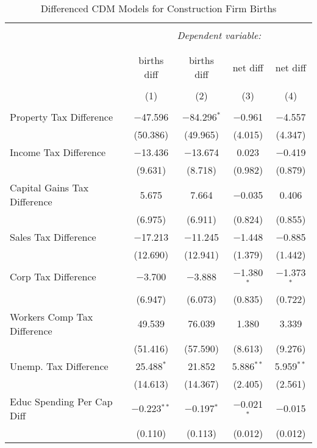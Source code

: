 
\begin{table}[!htbp] \centering 
  \caption{Differenced CDM Models for  Construction Firm Births} 
  \label{} 
\begin{tabular}{@{\extracolsep{5pt}}lcccc} 
\\[-1.8ex]\hline 
\hline \\[-1.8ex] 
 & \multicolumn{4}{c}{\textit{Dependent variable:}} \\ 
\cline{2-5} 
\\[-1.8ex] & \multicolumn{4}{c}{ } \\ 
 & births diff & births diff & net diff & net diff \\ 
\\[-1.8ex] & (1) & (2) & (3) & (4)\\ 
\hline \\[-1.8ex] 
 Property Tax Difference & $-$47.596 & $-$84.296$^{*}$ & $-$0.961 & $-$4.557 \\ 
  & (50.386) & (49.965) & (4.015) & (4.347) \\ 
  Income Tax Difference & $-$13.436 & $-$13.674 & 0.023 & $-$0.419 \\ 
  & (9.631) & (8.718) & (0.982) & (0.879) \\ 
  Capital Gains Tax Difference & 5.675 & 7.664 & $-$0.035 & 0.406 \\ 
  & (6.975) & (6.911) & (0.824) & (0.855) \\ 
  Sales Tax Difference & $-$17.213 & $-$11.245 & $-$1.448 & $-$0.885 \\ 
  & (12.690) & (12.941) & (1.379) & (1.442) \\ 
  Corp Tax Difference & $-$3.700 & $-$3.888 & $-$1.380$^{*}$ & $-$1.373$^{*}$ \\ 
  & (6.947) & (6.073) & (0.835) & (0.722) \\ 
  Workers Comp Tax Difference & 49.539 & 76.039 & 1.380 & 3.339 \\ 
  & (51.416) & (57.590) & (8.613) & (9.276) \\ 
  Unemp. Tax Difference & 25.488$^{*}$ & 21.852 & 5.886$^{**}$ & 5.959$^{**}$ \\ 
  & (14.613) & (14.367) & (2.405) & (2.561) \\ 
  Educ Spending Per Cap Diff & $-$0.223$^{**}$ & $-$0.197$^{*}$ & $-$0.021$^{*}$ & $-$0.015 \\ 
  & (0.110) & (0.113) & (0.012) & (0.012) \\ 

\end{tabular}
\end{table}

